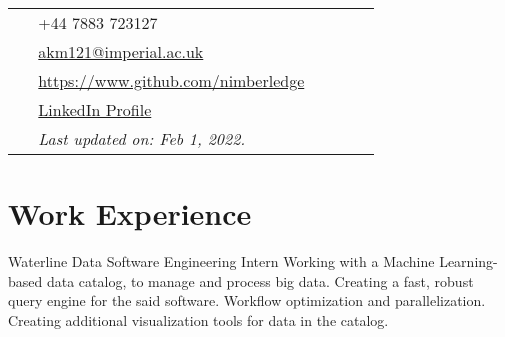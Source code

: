 \documentclass[10pt, oneside, openany]{article} %
\begin{document}
\begin{paracol}{2}
\parbox[top][0.09\textheight][c]{\linewidth}{ %
	\vspace{-0.05\textheight} %
	\colorbox{shade}{ %
		\begin{supertabular}{p{0.05\linewidth}|p{0.775\linewidth}} %
			\raisebox{-1pt}{\faPhone} & +44 7883 723127 \\ %
			\raisebox{0pt}{\small\faEnvelope} & \href{mailto:akm121@imperial.ac.uk}{akm121@imperial.ac.uk} \\ %
			\raisebox{-1pt}{\faGithub} & \href{https://www.github.com/nimberledge}{https://www.github.com/nimberledge} \\ %
			\raisebox{-1pt}{\faLinkedinSquare} & \href{https://www.linkedin.com/in/akhil-krishna-m-a308a8131/}{LinkedIn Profile} \\ %
			\raisebox{-1pt}{} & \textit{Last updated on: Feb 1, 2022.}\\
		\end{supertabular}
	}
}


\section{Work Experience}




{} %
{Waterline Data} %
{Software Engineering Intern} %
{Working with a Machine Learning-based data catalog, to manage and process big data. Creating a fast, robust query engine for the said software. Workflow optimization and parallelization. Creating additional visualization tools for data in the catalog.}%


\end{paracol}
\end{document}
